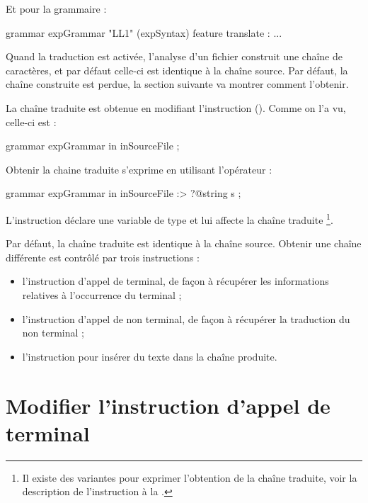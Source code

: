 Et pour la grammaire :
\begin{galgascode}
grammar expGrammar "LL1" (expSyntax) feature translate :
  ...
\end{galgascode}

Quand la traduction est activée, l'analyse d'un fichier construit une chaîne de caractères, et par défaut celle-ci est identique à la chaîne source. Par défaut, la chaîne construite est perdue, la section suivante va montrer comment l'obtenir.









La chaîne traduite est obtenue en modifiant l'instruction  (). Comme on l'a vu, celle-ci est : 
\begin{galgascode}
grammar expGrammar in inSourceFile ;
\end{galgascode}

Obtenir la chaine traduite s'exprime en utilisant l'opérateur  \galgas{\:>} :
\begin{galgascode}
grammar expGrammar in inSourceFile :> ?@string s ;
\end{galgascode}

L'instruction déclare une variable  de type  et lui affecte la chaîne traduite \footnote{Il existe des variantes pour exprimer l'obtention de la chaîne traduite, voir la description de l'instruction  à la .}.

Par défaut, la chaîne traduite est identique à la chaîne source. Obtenir une chaîne différente est contrôlé par trois instructions :
\begin{itemize}
  \item l'instruction d'appel de terminal, de façon à récupérer les informations relatives à l'occurrence du terminal ;
  \item l'instruction d'appel de non terminal, de façon à récupérer la traduction du non terminal ;
  \item l'instruction  pour insérer du texte dans la chaîne produite.
\end{itemize}







\section{Modifier l'instruction d'appel de terminal}

